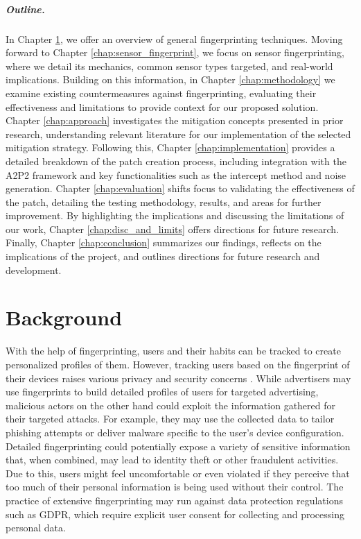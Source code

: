 \documentclass[11pt,
  oneside,openany,    %
]{scrreprt}
\begin{document}
\paragraph{Outline.}
In Chapter \ref{chap:background}, we offer an overview of general fingerprinting techniques. 
Moving forward to Chapter \ref{chap:sensor_fingerprint}, we focus on sensor fingerprinting, where we detail its mechanics, common sensor types targeted, and real-world implications.
Building on this information, in Chapter \ref{chap:methodology} we examine existing countermeasures against fingerprinting, evaluating their effectiveness and limitations to provide context for our proposed solution. 
Chapter \ref{chap:approach} investigates the mitigation concepts presented in prior research, understanding relevant literature for our implementation of the selected mitigation strategy.
Following this, Chapter \ref{chap:implementation} provides a detailed breakdown of the patch creation process, including integration with the A2P2 framework and key functionalities such as the intercept method and noise generation. 
Chapter \ref{chap:evaluation} shifts focus to validating the effectiveness of the patch, detailing the testing methodology, results, and areas for further improvement. 
By highlighting the implications and discussing the limitations of our work, Chapter \ref{chap:disc_and_limits} offers directions for future research.
Finally, Chapter \ref{chap:conclusion} summarizes our findings, reflects on the implications of the project, and outlines directions for future research and development.


\chapter{Background}
\label{chap:background}
With the help of fingerprinting, users and their habits can be tracked to create personalized profiles of them.
However, tracking users based on the fingerprint of their devices raises various privacy and security concerns \cite{DBLP:conf/ndss/MengZXZZBLTD23}.
While advertisers may use fingerprints to build detailed profiles of users for targeted advertising, malicious actors on the other hand could exploit the information gathered for their targeted attacks. 
For example, they may use the collected data to tailor phishing attempts or deliver malware specific to the user's device configuration.
Detailed fingerprinting could potentially expose a variety of sensitive information that, when combined, may lead to identity theft or other fraudulent activities.
Due to this, users might feel uncomfortable or even violated if they perceive that too much of their personal information is being used without their control.
The practice of extensive fingerprinting may run against data protection regulations such as GDPR, which require explicit user consent for collecting and processing personal data.
\end{document}
